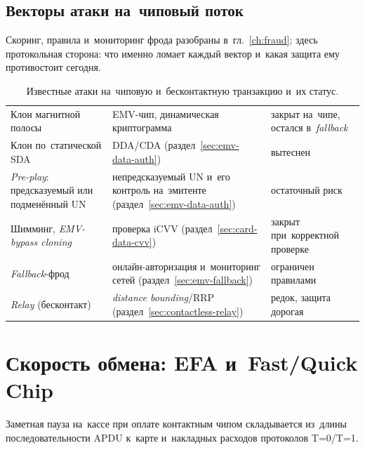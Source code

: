 \subsection*{Векторы атаки на~чиповый поток}

Скоринг, правила и~мониторинг фрода разобраны в~гл.~\ref{ch:fraud}; здесь
протокольная сторона: что именно ломает каждый вектор и~какая защита ему
противостоит сегодня.

\begin{table}[t]
  \caption{Известные атаки на~чиповую и~бесконтактную транзакцию и~их статус.}\label{tab:emv-attack-vectors}
  \begingroup
  \tablesetup
  \begin{tabularx}{\textwidth}{@{}P{10.5em} Y P{8.5em}@{}}
    \toprule
    \headrow
     &  &  \\
    \midrule
    Клон магнитной полосы & EMV-чип, динамическая криптограмма & закрыт на~чипе, остался в~\textit{fallback} \\
    \rowsep
    Клон по~статической SDA & DDA\slash CDA (раздел~\ref{sec:emv-data-auth}) & вытеснен \\
    \rowsep
    \textit{Pre-play}: предсказуемый или подменённый UN & непредсказуемый UN и~его контроль на~эмитенте (раздел~\ref{sec:emv-data-auth}) & остаточный риск \\
    \rowsep
    Шимминг, \textit{EMV-bypass cloning} & проверка iCVV (раздел~\ref{sec:card-data-cvv}) & закрыт при~корректной проверке \\
    \rowsep
    \textit{Fallback}-фрод & онлайн-авторизация и~мониторинг сетей (раздел~\ref{sec:emv-fallback}) & ограничен правилами \\
    \rowsep
    \textit{Relay} (бесконтакт) & \textit{distance bounding}\slash RRP (раздел~\ref{sec:contactless-relay}) & редок, защита дорогая \\
    \bottomrule
  \end{tabularx}\par
  \endgroup
\end{table}

\section{Скорость обмена: EFA и~Fast/Quick Chip}\label{sec:emv-fast-flows}

Заметная пауза на~кассе при оплате контактным чипом складывается из~длины
последовательности APDU к~карте и~накладных расходов протоколов T=0/T=1.

